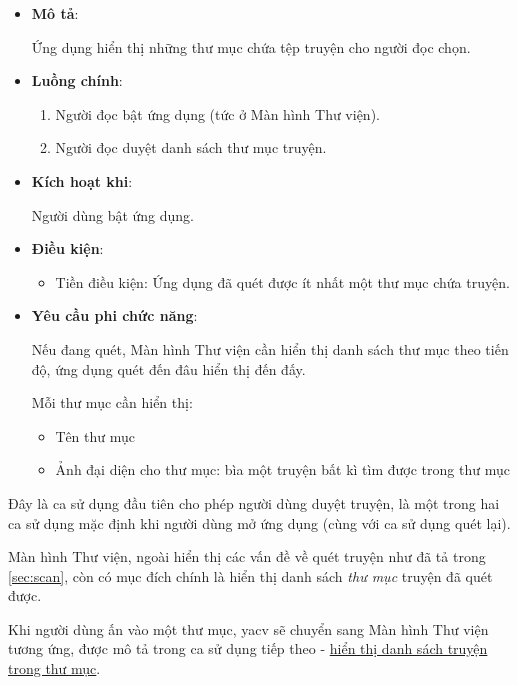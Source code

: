 \documentclass[../../thesis]{subfiles}
\begin{document}
\begin{itemize}
    \item
        \textbf{Mô tả}:

        Ứng dụng hiển thị những thư mục chứa tệp truyện cho người đọc chọn.
    \item
        \textbf{Luồng chính}:

        \begin{enumerate}
            \item
                Người đọc bật ứng dụng (tức ở Màn hình Thư viện).
            \item
                Người đọc duyệt danh sách thư mục truyện.
        \end{enumerate}
    \item
        \textbf{Kích hoạt khi}:

        Người dùng bật ứng dụng.
    \item
        \textbf{Điều kiện}:

        \begin{itemize}
            \item
                Tiền điều kiện: Ứng dụng đã quét được ít nhất một thư mục chứa
                truyện.
          \end{itemize}
    \item
        \textbf{Yêu cầu phi chức năng}:

        Nếu đang quét, Màn hình Thư viện cần hiển thị danh sách thư mục theo
        tiến độ, ứng dụng quét đến đâu hiển thị đến đấy.

        Mỗi thư mục cần hiển thị:

        \begin{itemize}
            \item
                Tên thư mục
            \item
                Ảnh đại diện cho thư mục: bìa một truyện bất kì tìm được trong
                thư mục
        \end{itemize}
\end{itemize}

Đây là ca sử dụng đầu tiên cho phép người dùng duyệt truyện, là một trong hai ca
sử dụng mặc định khi người dùng mở ứng dụng (cùng với ca sử dụng quét lại).

Màn hình Thư viện, ngoài hiển thị các vấn đề về quét truyện như đã tả trong
\ref{sec:scan}, còn có mục đích chính là hiển thị danh sách \emph{thư mục}
truyện đã quét được.

Khi người dùng ấn vào một thư mục, yacv sẽ chuyển sang Màn hình Thư viện tương
ứng, được mô tả trong ca sử dụng tiếp theo -
\hyperref[sec:show-comics-in-folder]{hiển thị danh sách truyện trong thư mục}.
\end{document}
